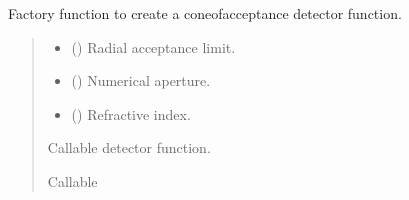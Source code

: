 \documentclass[letterpaper,10pt,english]{sphinxmanual}
\begin{document}
\begin{fulllineitems}
\label{\detokenize{generated/photon_canon.hardware:photon_canon.hardware.create_cone_of_acceptance}}
\pysigstartsignatures
\pysiglinewithargsret
{}
{\sphinxparamcomma {}\sphinxparamcomma {}}
{}
\pysigstopsignatures
\sphinxAtStartPar
Factory function to create a cone\sphinxhyphen{}of\sphinxhyphen{}acceptance detector function.
\begin{quote}\begin{description}
\begin{itemize}
\item {} 
\sphinxAtStartPar
{} () \textendash{} Radial acceptance limit.

\item {} 
\sphinxAtStartPar
{} () \textendash{} Numerical aperture.

\item {} 
\sphinxAtStartPar
{} () \textendash{} Refractive index.

\end{itemize}

\sphinxAtStartPar
Callable detector function.

\sphinxAtStartPar
Callable

\end{description}\end{quote}

\end{fulllineitems}

\end{document}
